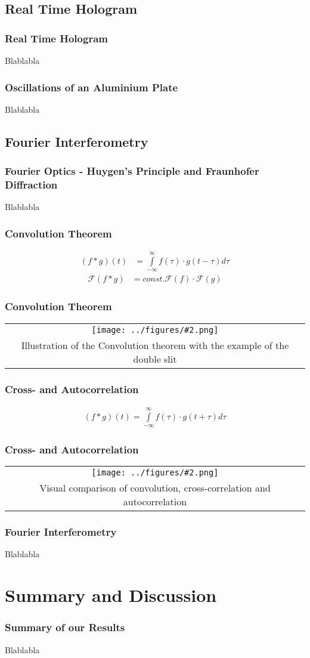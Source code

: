 \documentclass{beamer}
\newcommand{\gra}[3][]{
	\begin{tabular}[width=\textwidth]{c}
		\texttt{[image: ../figures/\#2.png]}\\
		\small #3
	\end{tabular}
}
\begin{document}
\subsection{Real Time Hologram}
\frame{\tableofcontents[currentsubsection]}
\begin{frame}
	\frametitle{Real Time Hologram}
	Blablabla
\end{frame}
\begin{frame}
	\frametitle{Oscillations of an Aluminium Plate}
	Blablabla
\end{frame}
\subsection{Fourier Interferometry}
\frame{\tableofcontents[currentsubsection]}
\begin{frame}
	\frametitle{Fourier Optics - Huygen's Principle and Fraunhofer Diffraction}
	Blablabla
\end{frame}
\begin{frame}
	\frametitle{Convolution Theorem}
	\begin{align}
	(f*g)(t)&=\int\limits_{-\infty}^{\infty} f(\tau)\cdot g(t-\tau) d\tau
	\end{align}
	\begin{align}
	\mathscr{F}(f*g)&=const. \mathscr{F}(f)\cdot \mathscr{F}(g)
	\end{align}
\end{frame}
\begin{frame}
	\frametitle{Convolution Theorem}
	\gra[0.4]{Convolution}{Illustration of the Convolution theorem with the example of the double slit}
\end{frame}
\begin{frame}
	\frametitle{Cross- and Autocorrelation}
	\begin{align}
	(f*g)(t)=\int\limits_{-\infty}^{\infty} f(\tau)\cdot g(t+\tau) d\tau \label{corr}
	\end{align}
\end{frame}
\begin{frame}
	\frametitle{Cross- and Autocorrelation}
	\gra[0.5]{correlation}{Visual comparison of convolution, cross-correlation and autocorrelation  \footnotemark} 
\end{frame}
\begin{frame}
	\frametitle{Fourier Interferometry}
	Blablabla
\end{frame}

\section{Summary and Discussion}
\frame{\tableofcontents[currentsection]}
\begin{frame}
	\frametitle{Summary of our Results}
	Blablabla
\end{frame}
\end{document}
